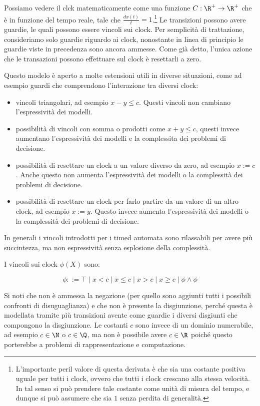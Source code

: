Possiamo vedere il clck matematicamente come una funzione \(C: \R^+ \to \R^+\) che è in funzione del tempo reale, tale che \(\frac{d x(t)}{t} = 1\).\footnote{L'importante peril valore di questa derivata è che sia una costante positiva uguale per tutti i clock, ovvero che tutti i clock crescano alla stessa velocità. In tal senso si può prendere tale costante come unità di misura del tempo, e dunque si può assumere che sia \(1\) senza perdita di generalità.} Le transizioni possono avere guardie, le quali possono essere vincoli sui clock. Per semplicità di trattazione, consideriamo solo guardie riguardo ai clock, nonostante in linea di principio le guardie viste in precedenza sono ancora ammesse. Come già detto, l'unica azione che le transazioni possono effettuare sul clock è resettarli a zero.

\begin{note}{}
  Questo modelo è aperto a molte estensioni utili in diverse situazioni, come ad esempio guardi che comprendono l'interazione tra diversi clock:
  \begin{itemize}
    \item vincoli triangolari, ad esempio \(x-y \leq c\). Questi vincoli non cambiano l'espressività dei modelli.
    \item possibilità di vincoli con somma o prodotti come \(x+y \leq c\), questi invece aumentano l'espressività dei modelli e la complessita dei problemi di decisione.
    \item possibilità di resettare un clock a un valore diverso da zero, ad esempio \(x := c\). Anche questo non aumenta l'espressività dei modelli o la complessità dei problemi di decisione.
    \item possibilità di resettare un clock per farlo partire da un valore di un altro clock, ad esempio \(x := y\). Questo invece aumenta l'espressività dei modelli o la complessità dei problemi di decisione.
  \end{itemize}

  In generali i vincoli introdotti per i timed automata sono rilassabili per avere più succintezza, ma non espressività senza esplosione della complessità.
\end{note}

I vincoli sui clock \(\phi(X)\) sono:

\[\phi ::= \top \mid x<c\mid x\leq c\mid x > c \mid x \geq c \mid \phi \land \phi\]

Si noti che non è ammessa la negazione (per quello sono aggiunti tutti i possibili confronti di disuguaglianza) e che non è presente la disgiunzione, perché questa è modellata tramite più transizioni avente come guardie i diversi disgiunti che compongono la disgiunzione. Le costanti \(c\) sono invece di un dominio numerabile, ad esempio \(c \in \N\) o \(c \in \Q\), ma non è possibile avere \(c \in \R\) poiché questo porterebbe a problemi di rappresentazione e computazione.

